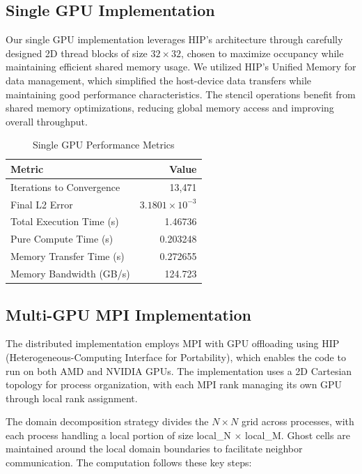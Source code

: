 \documentclass{article}
\begin{document}
\subsection{Single GPU Implementation}

Our single GPU implementation leverages HIP's architecture through carefully designed 2D thread blocks of size $32 \times 32$, chosen to maximize occupancy while maintaining efficient shared memory usage. We utilized HIP's Unified Memory for data management, which simplified the host-device data transfers while maintaining good performance characteristics. The stencil operations benefit from shared memory optimizations, reducing global memory access and improving overall throughput.

\begin{table}[h]
\centering
\caption{Single GPU Performance Metrics}
\begin{tabular}{lr}
\toprule
Metric & Value \\
\midrule
Iterations to Convergence & 13,471 \\
Final L2 Error & $3.1801 \times 10^{-3}$ \\
Total Execution Time (s) & 1.46736 \\
Pure Compute Time (s) & 0.203248 \\
Memory Transfer Time (s) & 0.272655 \\
Memory Bandwidth (GB/s) & 124.723 \\
\bottomrule
\end{tabular}
\label{tab:single-gpu-metrics}
\end{table}

\newpage

\subsection{Multi-GPU MPI Implementation}

The distributed implementation employs MPI with GPU offloading using HIP (Heterogeneous-Computing Interface for Portability), which enables the code to run on both AMD and NVIDIA GPUs. The implementation uses a 2D Cartesian topology for process organization, with each MPI rank managing its own GPU through local rank assignment.

The domain decomposition strategy divides the $N \times N$ grid across processes, with each process handling a local portion of size local\_N $\times$ local\_M. Ghost cells are maintained around the local domain boundaries to facilitate neighbor communication. The computation follows these key steps:
\end{document}
